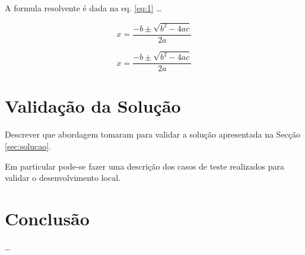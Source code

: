 \documentclass[a4paper]{report} %
\begin{document}
A formula resolvente é dada na eq. \ref{eq:1} \ldots

\begin{equation}
\label{eq:1}
	x = \frac{-b \pm \sqrt{b^2 - 4ac} }{2a}
\end{equation}

\begin{equation}
\label{eq:2}
	x = \frac{-b \pm \sqrt{b^2 - 4ac}}{2a}
\end{equation}

\chapter{Validação da Solução}

Descrever que abordagem tomaram para validar a solução apresentada na Secção \ref{sec:solucao}.

Em particular pode-se fazer uma descrição dos casos de teste
realizados para validar o desenvolvimento local.


\chapter{Conclusão}

\ldots


    
\end{document}
